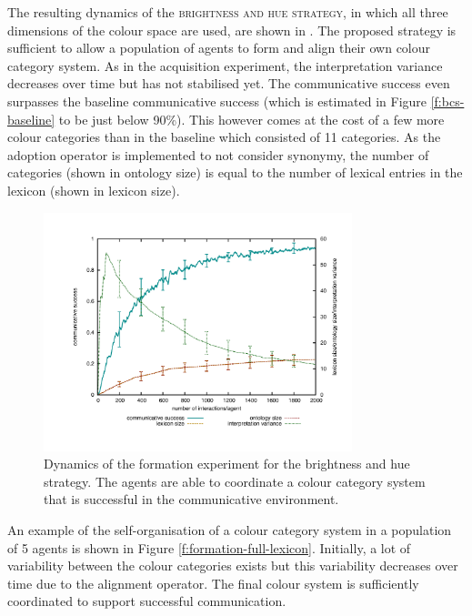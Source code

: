 The resulting dynamics of the \textsc{brightness and hue strategy}, in
which all three dimensions of the colour space are used, are shown in
. The proposed strategy is
sufficient to allow a population of agents to form and align their own
colour category system. As in the acquisition experiment, the
interpretation variance decreases over time but has not stabilised
yet. The communicative success even surpasses the baseline
communicative success (which is estimated in Figure
\ref{f:bcs-baseline} to be just below 90\%). This however comes at the
cost of a few more colour categories than in the baseline which
consisted of 11 categories. As the adoption operator is implemented to
not consider synonymy, the number of categories (shown in ontology
size) is equal to the number of lexical entries in the lexicon (shown
in lexicon size).

\begin{figure}[htpb]
  \begin{center}
    \includegraphics[width=0.8\textwidth]{./basic-operators/figures/formation-full.pdf}
    \caption[Dynamics of the formation experiment for the brightness
    and hue strategy]{Dynamics of the formation experiment for the
      brightness and hue strategy. The agents are able to coordinate a
      colour category system that is successful in the communicative
      environment.}
    \label{f:formation-full-dynamics}
  \end{center}
\end{figure}

An example of the self-organisation of a colour category system in a
population of 5 agents is shown in Figure
\ref{f:formation-full-lexicon}. Initially, a lot of variability
between the colour categories exists but this variability decreases
over time due to the alignment operator. The final colour system is
sufficiently coordinated to support successful communication.


